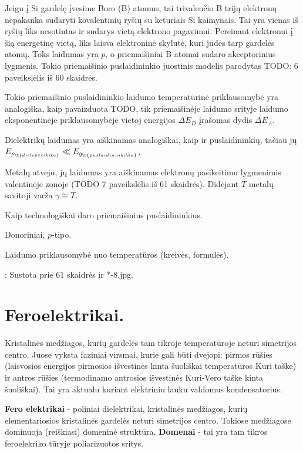 Jeigu į Si gardelę įvesime Boro (B) atomus, tai trivalenčio B
trijų elektronų nepakanka sudaryti kovalentinių ryšių su
keturiais Si kaimynais. Tai yra vienas iš ryšių liks nesotintas
ir sudarys vietą elektrono pagavimui. Pereinant elektronui į šią
energetinę vietą, liks laisva elektroninė skylutė, kuri judės
tarp gardelės atomų. Toks laidumas yra $p$, o priemaišiniai
B atomai sudaro akceptorinius lygmenis. Tokio priemaišinio puslaidininkio
juostinis modelis parodytas TODO: 6 paveikslėlis iš 60 skaidrės.

Tokio priemaišinio puslaidininkio laidumo temperatūrinė priklausomybė
yra analogiška, kaip pavaizduota TODO, tik priemaišinėje laidumo
srityje laidumo eksponentinėje priklausomybėje vietoj
energijos $\Delta E_{D}$ įrašomas dydis $\Delta E_{A}$.

Dielektrikų laidumas yra aiškinamas analogiškai, kaip ir puslaidininkių,
tačiau jų $E_{\rho_{\t{dielektrikų}}} \ll E_{g_{\t{puslaidininkių}}}$.

Metalų atveju, jų laidumas yra aiškinamas elektronų pasikeitimu lygmenimis
valentinėje zonoje (TODO 7 paveikslėlis iš 61 skaidrės).
Didėjant $T$ metalų savitoji varža $\gamma \cong T$.

\begin{remember}
  \item Kaip technologiškai daro priemaišinius puslaidininkius.
  \item Donoriniai, $p$-tipo.
  \item Laidumo priklausomybė nuo temperatūros (kreivės, formulės).
\end{remember}

\TODO: Sustota prie 61 skaidrės ir *-8.jpg.

\section{Feroelektrikai.}
Kristalinės medžiagos, kurių gardelės tam tikroje temperatūroje neturi
simetrijos centro. Juose vyksta faziniai virsmai, kurie gali būti
dvejopi: pirmos rūšies (laisvosios energijos pirmosios išvestinės
kinta šuoliškai temperatūros Kuri taške) ir antros rūšies (termodinamo
antrosios išvestinės Kuri-Vero taške kinta šuoliškai). Tai yra
aktualu kuriant elektriniu lauku valdomus kondensatorius.

\textbf{Fero elektrikai} - poliniai dielektrikai,
kristalinės medžiagos, kurių elementariosios kristalinės gardelės neturi simetrijos centro.
Tokiose medžiagose dominuoja (reiškiasi) domeninė struktūra.
\textbf{Domenai} - tai yra tam tikros feroelekriko tūryje poliarizuotos sritys.

